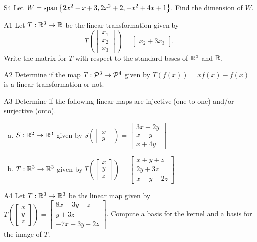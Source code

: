 \documentclass{sbgLAexam}
\begin{document}
\begin{problem}{S4}
  Let \(
    W={\rm span}\left\{ 2x^2-x+3, 2x^2+2, -x^2+4x+1 \right\}\).
  Find the dimension of \(W\).
\end{problem}
\newpage

\begin{problem}{A1}
Let $T: \IR^3 \rightarrow \IR$ be the linear transformation given by $$T\left(\begin{bmatrix} x_1 \\ x_2 \\ x_3  \end{bmatrix} \right) = \begin{bmatrix} x_2+3x_3 \end{bmatrix}.$$ Write the matrix for $T$ with respect to the standard bases of $\IR^3$ and $\IR$.
\end{problem}

\begin{problem}{A2}
Determine if the map $T: \P^3 \rightarrow \P^4$ given by $T(f(x))=xf(x)-f(x)$ is a linear transformation or not.
\end{problem}
\newpage

\begin{problem}{A3}
Determine if the following linear maps are injective (one-to-one) and/or surjective (onto).
\begin{enumerate}[(a)]
\item $S: \IR^2 \rightarrow \IR^3$ given by $S\left(\begin{bmatrix} x \\ y  \end{bmatrix} \right) = \begin{bmatrix} 3x+2y \\ x-y \\ x+4y \end{bmatrix} $
\item $T: \IR^3 \rightarrow \IR^3$ given by $T\left(\begin{bmatrix} x \\ y \\ z  \end{bmatrix} \right) = \begin{bmatrix} x+y+z \\ 2y+3z \\ x-y-2z \end{bmatrix} $
\end{enumerate}
\end{problem}

\begin{problem}{A4}
Let $T: \IR^3 \rightarrow \IR^3$ be the linear map given by \(
  T\left(\begin{bmatrix} x \\ y \\ z \end{bmatrix} \right) =
  \begin{bmatrix}
    8x-3y-z \\
    y+3z \\
    -7x+3y+2z
  \end{bmatrix}
\). Compute a basis for the kernel and a basis for the image of $T$.
\end{problem}
\newpage
\end{document}
